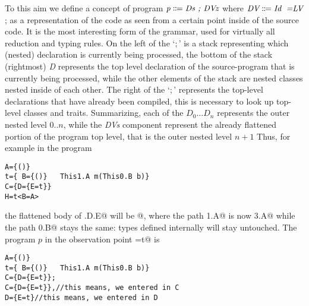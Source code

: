 To this aim we define a concept of program 
$\textit{p}\Coloneqq\textit{Ds\Q{;} \DVz}$
where 
$\textit{DV}\Coloneqq\textit{\Id\eq{LV}}$; as a representation of 
the code as seen from a certain point inside of the source code. It is the most interesting form of the grammar,
used for virtually all reduction and typing rules. On the left of the `$;$' is a stack representing which (nested) declaration is currently being processed,
the bottom of the stack (rightmost) \textit{D} represents the top level declaration of the source-program that is currently being processed, while the other elements of the stack are nested classes nested inside of each other.
The right of the `$;$' represents the top-level declarations that have already been compiled, this is necessary to look up top-level classes and traits.
Summarizing, each of the $\textit{D}_0\ldots\textit{D}_n$
represents the outer nested level $0..n$, while
the \textit{DVs} component represent the already flattened portion of the program top level, that is 
the outer nested level $n+1$
Thus, for example in the program
\begin{lstlisting}
A={()}
t={ B={()}   This1.A m(This0.B b)}
C={D={E=t}}
H=t<B=A>
\end{lstlisting}
the flattened body of \Q@C.D.E@ will be 
@, where the path
\Q@This1.A@ is now \Q@This3.A@ while the path \Q@This0.B@ stays the same: types defined internally will
stay untouched.
The program $p$ in the observation point \Q@E=t@ is
\begin{lstlisting}
A={()}
t={ B={()}   This1.A m(This0.B b)}
C={D={E=t}};
C={D={E=t}},//this means, we entered in C
D={E=t}//this means, we entered in D
\end{lstlisting}



